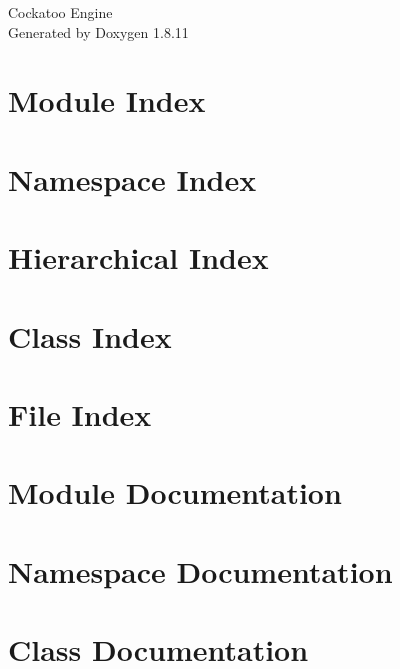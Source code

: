\documentclass[twoside]{book}
\newcommand{\+}{\discretionary{\mbox{\scriptsize$\hookleftarrow$}}{}{}}
\newcommand{\clearemptydoublepage}{%
  \newpage{\pagestyle{empty}\cleardoublepage}%
}
\begin{document}
\hypersetup{pageanchor=false,
             bookmarks=true,
             bookmarksnumbered=true,
             pdfencoding=unicode
            }
\begin{titlepage}
\vspace*{7cm}
\begin{center}%
{\Large Cockatoo Engine }\\
\vspace*{1cm}
{\large Generated by Doxygen 1.8.11}\\
\end{center}
\end{titlepage}
\clearemptydoublepage
\tableofcontents
\clearemptydoublepage
{}
\hypersetup{pageanchor=true}

\chapter{Module Index}

\chapter{Namespace Index}

\chapter{Hierarchical Index}

\chapter{Class Index}

\chapter{File Index}

\chapter{Module Documentation}




\chapter{Namespace Documentation}

\chapter{Class Documentation}























\end{document}
